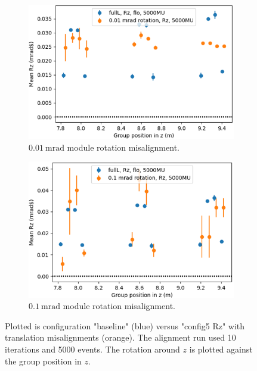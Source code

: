 \begin{figure}
  \centering
  \begin{subfigure}[b]{0.48\textwidth}
    \centering
    \includegraphics[width=\textwidth]{plots/misalign_rota/001_rot_Rz.png}
    \caption{$\SI{0.01}{\milli\radian}$ module rotation misalignment.}
    \label{fig:001Rz}
  \end{subfigure}
  \hfill
  \begin{subfigure}[b]{0.48\textwidth}
    \centering
    \includegraphics[width=\textwidth]{plots/misalign_rota/01_rot_Rz.png}
    \caption{$\SI{0.1}{\milli\radian}$ module rotation misalignment.}
    \label{fig:01Rz}
  \end{subfigure}
  \caption{Plotted is configuration "baseline" (blue) versus "config5 Rz" with translation misalignments (orange). The alignment run used 10 iterations and 5000 events. The rotation around $z$ is plotted against the group position in $z$.}
  \label{fig:mis_rot_Rz}
\end{figure}

